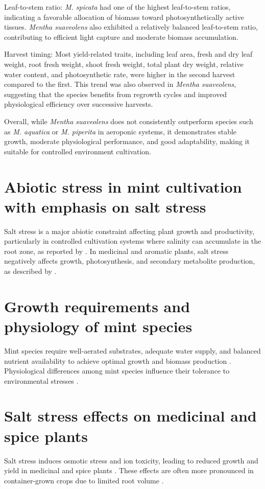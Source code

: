 Leaf-to-stem ratio: \textit{M. spicata} had one of the highest leaf-to-stem ratios, indicating a favorable allocation of biomass toward photosynthetically active tissues. \textit{Mentha suaveolens} also exhibited a relatively balanced leaf-to-stem ratio, contributing to efficient light capture and moderate biomass accumulation.

Harvest timing: Most yield-related traits, including leaf area, fresh and dry leaf weight, root fresh weight, shoot fresh weight, total plant dry weight, relative water content, and photosynthetic rate, were higher in the second harvest compared to the first. This trend was also observed in \textit{Mentha suaveolens}, suggesting that the species benefits from regrowth cycles and improved physiological efficiency over successive harvests.

Overall, while \textit{Mentha suaveolens} does not consistently outperform species such as \textit{M. aquatica} or \textit{M. piperita} in aeroponic systems, it demonstrates stable growth, moderate physiological performance, and good adaptability, making it suitable for controlled environment cultivation.

\section{Abiotic stress in mint cultivation with emphasis on salt stress}
Salt stress is a major abiotic constraint affecting plant growth and productivity, particularly in controlled cultivation systems where salinity can accumulate in the root zone, as reported by \textcite{Hasanuzzaman2021}. In medicinal and aromatic plants, salt stress negatively affects growth, photosynthesis, and secondary metabolite production, as described by \textcite{AcostaMotos2017}.

\section{Growth requirements and physiology of mint species}
Mint species require well-aerated substrates, adequate water supply, and balanced nutrient availability to achieve optimal growth and biomass production \textcite{Zheljazkov2020}. Physiological differences among mint species influence their tolerance to environmental stresses \textcite{Singh2022}.

\section{Salt stress effects on medicinal and spice plants}
Salt stress induces osmotic stress and ion toxicity, leading to reduced growth and yield in medicinal and spice plants \textcite{Shahid2020}. These effects are often more pronounced in container-grown crops due to limited root volume \textcite{Hasanuzzaman2021}.

